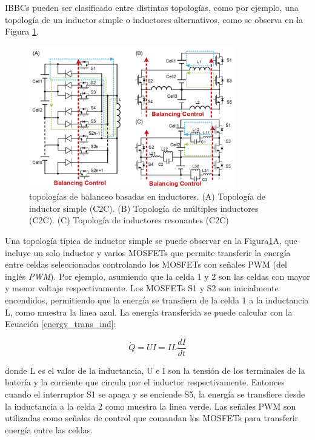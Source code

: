 \documentclass[10pt,a4paper]{article}
\begin{document}
\acrshort{IBBC}s pueden ser clasificado entre distintas topolog\'ias, como por
ejemplo, una topolog\'ia de un inductor simple o inductores alternativos, como
se observa en la Figura \ref{ibbc_top}.

\begin{figure}[h!]
    \begin{center}
        \includegraphics[width=0.8\textwidth]{ibbc_top.png}
        \caption{topolog\'ias de balanceo basadas en inductores. (A) Topolog\'ia
        de inductor simple (\acrshort{C2C}). (B) Topolog\'ia de m\'ultiples
        inductores (\acrshort{C2C}). (C) Topolog\'ia de inductores resonantes
        (\acrshort{C2C})}
        \label{ibbc_top}
    \end{center}
\end{figure}

Una topolog\'ia t\'ipica de inductor simple se puede observar en la
Figura\ref{ibbc_top}A, que incluye un solo inductor y varios MOSFETs que permite
transferir la energ\'ia entre celdas seleccionadas controlando los MOSFETs con
señales \acrshort{PWM} (del ingl\'es \emph{\acrlong{PWM}}). Por ejemplo, 
asumiendo que la celda 1 y 2 son las celdas con mayor y menor voltaje 
respectivamente. Los MOSFETs S1 y S2 son inicialmente encendidos, permitiendo 
que la energ\'ia se transfiera de la celda 1 a la inductancia L, como muestra la 
linea azul. La energ\'ia transferida se puede calcular con la Ecuaci\'on 
\ref{energy_trans_ind}:

\begin{equation}
    \dot{Q} = UI = IL\frac{dI}{dt} \label{energy_trans_ind}
\end{equation}

donde L es el valor de la inductancia, U e I son la tensi\'on de los terminales
de la bater\'ia y la corriente que circula por el inductor respectivamente.
Entonces cuando el interruptor S1 se apaga y se enciende S5, la energ\'ia se
transfiere desde la inductancia a la celda 2 como muestra la linea verde.
Las señales \acrshort{PWM} son utilizadas como señales de control que comandan 
los MOSFETs para transferir energ\'ia entre las celdas.
\end{document}
